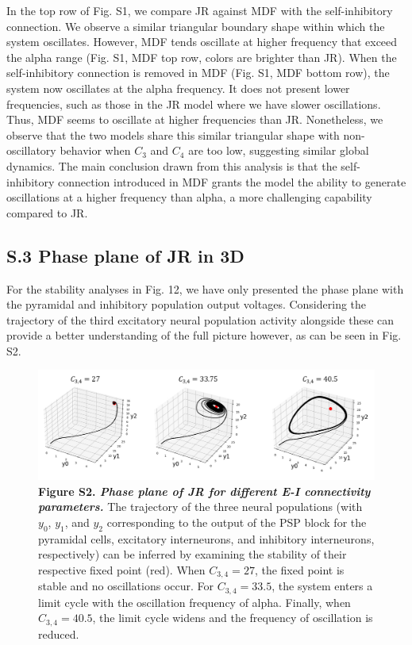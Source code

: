\documentclass[12pt,twoside]{article}
\begin{document}
In the top row of Fig. S1, we compare JR against MDF with the self-inhibitory connection. We observe a similar triangular boundary shape within which the system oscillates. However, MDF tends oscillate at higher frequency that exceed the alpha range (Fig. S1, MDF top row, colors are brighter than JR). When the self-inhibitory connection is removed in MDF (Fig. S1, MDF bottom row), the system now oscillates at the alpha frequency. It does not present lower frequencies, such as those in the JR model where we have slower oscillations. Thus, MDF seems to oscillate at higher frequencies than JR. Nonetheless, we observe that the two models share this similar triangular shape with non-oscillatory behavior when $C_3$ and $C_4$ are too low, suggesting similar global dynamics. The main conclusion drawn from this analysis is that the self-inhibitory connection introduced in MDF grants the model the ability to generate oscillations at a higher frequency than alpha, a more challenging capability compared to JR. 


\newpage
\subsection*{S.3 Phase plane of JR in 3D}

For the stability analyses in Fig. 12, we have only presented the phase plane with the pyramidal and inhibitory population output voltages. Considering the trajectory of the third excitatory neural population activity alongside these can provide a better understanding of the full picture however, as can be seen in Fig. S2.


\begin{figure}[H]
    \centering
    \includegraphics[scale=0.5]{Images/Appendix_stab.png}
    \caption*{\textbf{Figure S2.  \textit{Phase plane of JR for different E-I connectivity parameters.}} The trajectory of the three neural populations (with $y_0$, $y_1$, and $y_2$ corresponding to the output of the PSP block for the pyramidal cells, excitatory interneurons, and inhibitory interneurons, respectively) can be inferred by examining the stability of their respective fixed point (red). When $C_{3,4} = 27$, the fixed point is stable and no oscillations occur. For $C_{3,4} = 33.5$, the system enters a limit cycle with the oscillation frequency of alpha. Finally, when $C_{3,4} = 40.5$, the limit cycle widens and the frequency of oscillation is reduced.}     
    \label{fig:Stability3D}
\end{figure}
\end{document}

